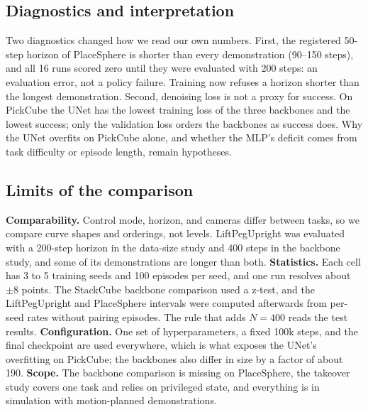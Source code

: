 \subsection{Diagnostics and interpretation}
Two diagnostics changed how we read our own numbers. First, the registered
50-step horizon of PlaceSphere is shorter than every demonstration (90--150
steps), and all 16 runs scored zero until they were evaluated with 200 steps:
an evaluation error, not a policy failure. Training now refuses a horizon
shorter than the longest demonstration. Second, denoising loss is not a proxy
for success. On PickCube the UNet has the lowest training loss of the three
backbones and the lowest success; only the validation loss orders the
backbones as success does. Why the UNet overfits on PickCube alone, and
whether the MLP's deficit comes from task difficulty or episode length, remain
hypotheses.

\subsection{Limits of the comparison}
\label{sec:limits}
\textbf{Comparability.} Control mode, horizon, and cameras differ between
tasks, so we compare curve shapes and orderings, not levels. LiftPegUpright
was evaluated with a 200-step horizon in the data-size study and 400 steps in
the backbone study, and some of its demonstrations are longer than both.
\textbf{Statistics.}
Each cell has 3 to 5 training seeds and 100 episodes per seed, and one run
resolves about $\pm8$ points. The StackCube backbone comparison used a z-test,
and the LiftPegUpright and PlaceSphere intervals were computed afterwards from
per-seed rates without pairing episodes. The rule that adds $N=400$ reads the
test results. \textbf{Configuration.} One set of hyperparameters, a fixed 100k
steps, and the final checkpoint are used everywhere, which is what exposes the
UNet's overfitting on PickCube; the backbones also differ in size by a factor
of about 190. \textbf{Scope.} The backbone comparison is missing on
PlaceSphere, the takeover study covers one task and relies on privileged
state, and everything is in simulation with motion-planned demonstrations.
